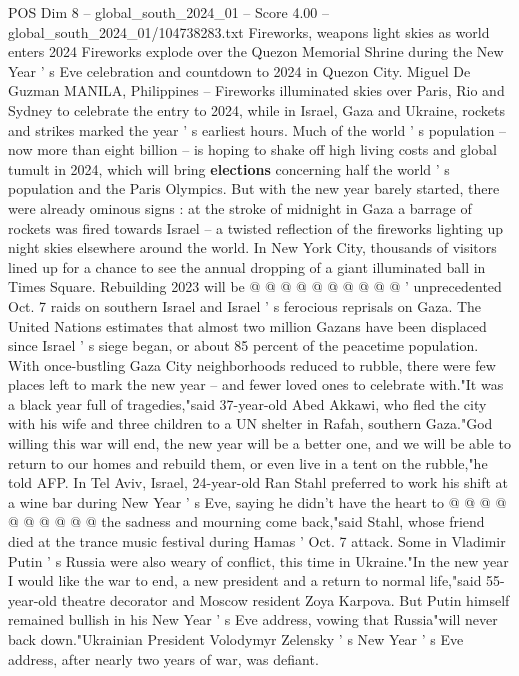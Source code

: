 \begin{textsample}{POS Dim 8 – global\_south\_2024\_01 – Score 4.00 – global\_south\_2024\_01/104738283.txt}  \label{ex:f8_pos_288}
Fireworks, weapons light skies as world enters 2024 Fireworks explode over the Quezon Memorial Shrine during the New Year ' s Eve celebration and countdown to 2024 in Quezon City.
Miguel De Guzman MANILA, Philippines -- Fireworks illuminated skies over Paris, Rio and Sydney to celebrate the entry to 2024, while in Israel, Gaza and Ukraine, rockets and strikes marked the year ' s earliest hours.
Much of the world ' s population -- now more than eight billion -- is hoping to shake off high living costs and global tumult in 2024, which will bring \textbf{elections} concerning half the world ' s population and the Paris Olympics.
But with the new year barely started, there were already ominous signs : at the stroke of midnight in Gaza a barrage of rockets was fired towards Israel -- a twisted reflection of the fireworks lighting up night skies elsewhere around the world.
In New York City, thousands of visitors lined up for a chance to see the annual dropping of a giant illuminated ball in Times Square.
Rebuilding 2023 will be @ @ @ @ @ @ @ @ @ @ ' unprecedented Oct. 7 raids on southern Israel and Israel ' s ferocious reprisals on Gaza.
The United Nations estimates that almost two million Gazans have been displaced since Israel ' s siege began, or about 85 percent of the peacetime population.
With once-bustling Gaza City neighborhoods reduced to rubble, there were few places left to mark the new year -- and fewer loved ones to celebrate with."It was a black year full of tragedies,"said 37-year-old Abed Akkawi, who fled the city with his wife and three children to a UN shelter in Rafah, southern Gaza."God willing this war will end, the new year will be a better one, and we will be able to return to our homes and rebuild them, or even live in a tent on the rubble,"he told AFP.
In Tel Aviv, Israel, 24-year-old Ran Stahl preferred to work his shift at a wine bar during New Year ' s Eve, saying he didn't have the heart to @ @ @ @ @ @ @ @ @ @ the sadness and mourning come back,"said Stahl, whose friend died at the trance music festival during Hamas ' Oct. 7 attack.
Some in Vladimir Putin ' s Russia were also weary of conflict, this time in Ukraine."In the new year I would like the war to end, a new president and a return to normal life,"said 55-year-old theatre decorator and Moscow resident Zoya Karpova.
But Putin himself remained bullish in his New Year ' s Eve address, vowing that Russia"will never back down."Ukrainian President Volodymyr Zelensky ' s New Year ' s Eve address, after nearly two years of war, was defiant.

\end{textsample}
